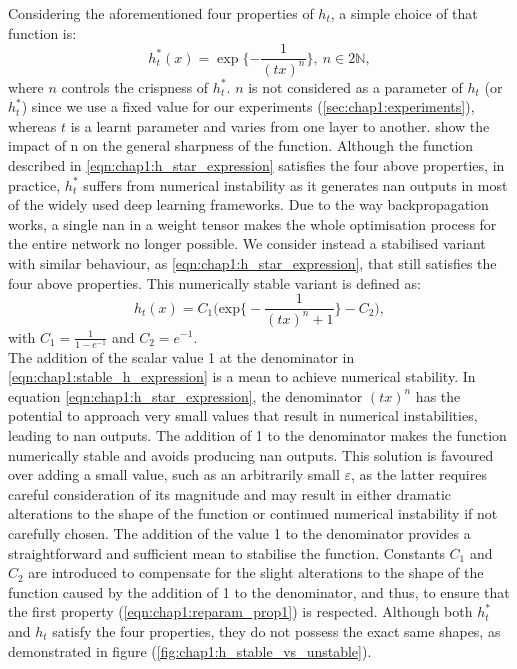 Considering the aforementioned four properties of $h_t$, a simple choice of that
function is:
\begin{equation}
  \label{eqn:chap1:h_star_expression}
  h_t^*(x) = \exp\bigg\{{-\displaystyle\frac{1}{(tx)^n}}\bigg\}, ~ n\in 2\mathds{N},
\end{equation}
\noindent where $n$ controls the crispness of $h_t^*$. $n$ is not considered as
a parameter of $h_t$ (or $h_t^*$) since we use a fixed value for our experiments
(\cref{sec:chap1:experiments}), whereas $t$ is a learnt parameter and varies
from one layer to another.  show the
impact of n on the general sharpness of the function. Although the function
described in \cref{eqn:chap1:h_star_expression} satisfies the four above
properties, in practice, $h_t^*$ suffers from numerical instability as it
generates \ac{nan} outputs in most of the widely used deep learning frameworks.
Due to the way backpropagation works, a single \ac{nan} in a weight tensor makes
the whole optimisation process for the entire network no longer possible. We
consider instead a stabilised variant with similar behaviour, as
\cref{eqn:chap1:h_star_expression},  that still satisfies the four above
properties. This numerically stable variant is defined as:
\begin{equation}
  \label{eqn:chap1:stable_h_expression}
  h_t(x) = C_1 \biggl( \text{exp} \bigg\{-\displaystyle\frac{1}{(tx)^n +1}\bigg\} - C_2 \biggr),
\end{equation}
\noindent with $C_1=\frac{1}{1-e^{-1}}$ and $C_2 = e^{-1}$.\\

The addition of the scalar value 1 at the denominator in
\cref{eqn:chap1:stable_h_expression} is a mean to achieve numerical stability.
In equation \cref{eqn:chap1:h_star_expression}, the denominator $(tx)^n$ has the
potential to approach very small values that result in numerical instabilities,
leading to \ac{nan} outputs. The addition of 1 to the denominator makes the
function numerically stable and avoids producing \ac{nan} outputs. This solution
is favoured over adding a small value, such as an arbitrarily small
$\varepsilon$, as the latter requires careful consideration of its magnitude and
may result in either dramatic alterations to the shape of the function or
continued numerical instability if not carefully chosen. The addition of the
value 1 to the denominator provides a straightforward and sufficient mean to
stabilise the function. Constants $C_1$ and $C_2$ are introduced to compensate
for the slight alterations to the shape of the function caused by the addition
of 1 to the denominator, and thus, to ensure that the first property
(\cref{eqn:chap1:reparam_prop1}) is respected. Although both $h_t^*$ and $h_t$
satisfy the four properties, they do not possess the exact same shapes, as
demonstrated in figure (\ref{fig:chap1:h_stable_vs_unstable}).\\

